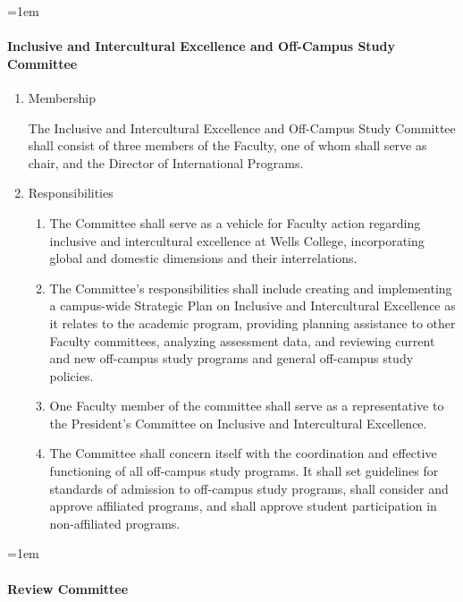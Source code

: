 \documentclass{manual}
\let\oldparagraph\paragraph
\renewcommand\paragraph{\leftskip=1em\oldparagraph}
\newcommand{\itemLevelA}{\alph*.}
\newcommand{\itemLevelB}{\arabic*)}
\newcommand{\itemRefA}{\alph*}
\newcommand{\itemRefB}{\arabic*}
\begin{document}
\paragraph{Inclusive and Intercultural Excellence and Off-Campus Study Committee}

	\begin{enumerate}[label=\itemLevelA,ref=\itemRefA]
	\item Membership

		The Inclusive and Intercultural Excellence and Off-Campus Study Committee shall consist of three members of the Faculty, one of whom shall serve as chair, and the Director of International Programs.

	\item Responsibilities

		\begin{enumerate}[label=\itemLevelB,ref=\itemRefB]
		\item The Committee shall serve as a vehicle for Faculty action regarding inclusive and intercultural excellence at Wells College, incorporating global and domestic dimensions and their interrelations.
		\item The Committee's responsibilities shall include creating and implementing a campus-wide Strategic Plan on Inclusive and Intercultural Excellence as it relates to the academic program, providing planning assistance to other Faculty committees, analyzing assessment data, and reviewing current and new off-campus study programs and general off-campus study policies.
		\item One Faculty member of the committee shall serve as a representative to the President's Committee on Inclusive and Intercultural Excellence.
		\item The Committee shall concern itself with the coordination and effective functioning of all off-campus study programs. It shall set guidelines for standards of admission to off-campus study programs, shall consider and approve affiliated programs, and shall approve student participation in non-affiliated programs.
		\end{enumerate}
	
	\end{enumerate}

\paragraph{Review Committee}\label{par:ReviewCommittee}
\end{document}

